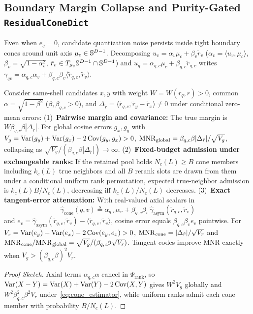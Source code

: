 \subsection{Boundary Margin Collapse and Purity-Gated \texttt{ResidualConeDict}}
\label{subsec:tangent_cone}

Even when $e_q = 0$, candidate quantization noise persists inside tight boundary cones around unit axis $\mu_c \in \mathbb{S}^{D-1}$.
Decomposing $u_v = \alpha_v\mu_c + \beta_v\tilde{r}_v$ ($\alpha_v = \langle u_v, \mu_c\rangle$, $\beta_v = \sqrt{1 - \alpha_v^2}$, $\tilde{r}_v \in T_{\mu_c}\mathbb{S}^{D-1} \cap \mathbb{S}^{D-1}$) and $u_q = \alpha_{q,c}\mu_c + \beta_{q,c}\tilde{r}_{q,c}$ writes $\gamma_{qv} = \alpha_{q,c}\alpha_v + \beta_{q,c}\beta_v\langle \tilde{r}_{q,c}, \tilde{r}_v\rangle$.

\begin{theorem}
\label{thm:tangent_cone}
Consider same-shell candidates $x, y$ with weight $W = W(r_q, r) > 0$, common $\alpha = \sqrt{1 - \beta^2}$ ($\beta, \beta_{q,c} > 0$), and $\Delta_{\tilde{r}} = \langle \tilde{r}_{q,c}, \tilde{r}_y - \tilde{r}_x\rangle \ne 0$ under conditional zero-mean errors:
(1)~\textbf{Pairwise margin and covariance:} The true margin is $W\beta_{q,c}\beta|\Delta_{\tilde{r}}|$. For global cosine errors $g_x, g_y$ with $V_g = \operatorname{Var}(g_y) + \operatorname{Var}(g_x) - 2\operatorname{Cov}(g_y, g_x) > 0$, $\mathrm{MNR}_{\mathrm{global}} = \beta_{q,c}\beta|\Delta_{\tilde{r}}| / \sqrt{V_g}$, collapsing as $\sqrt{V_g}/(\beta_{q,c}\beta|\Delta_{\tilde{r}}|) \to \infty$.
(2)~\textbf{Fixed-budget admission under exchangeable ranks:} If the retained pool holds $N_c(L) \ge B$ cone members including $k_c(L)$ true neighbors and all $B$ rerank slots are drawn from them under a conditional uniform rank permutation, expected true-neighbor admission is $k_c(L) B / N_c(L)$, decreasing iff $k_c(L) / N_c(L)$ decreases.
(3)~\textbf{Exact tangent-error attenuation:} With real-valued axial scalars in
\begin{equation}
  \hat{\gamma}_{\mathrm{cone}}(q, v) \triangleq \alpha_{q,c}\alpha_v + \beta_{q,c}\beta_v\,\hat{\gamma}_{\mathrm{asym}}(\tilde{r}_{q,c}, \tilde{r}_v)
  \label{eq:cone_estimator}
\end{equation}
and $e_v = \hat{\gamma}_{\mathrm{asym}}(\tilde{r}_{q,c}, \tilde{r}_v) - \langle \tilde{r}_{q,c}, \tilde{r}_v\rangle$, cosine error equals $\beta_{q,c}\beta_v e_v$ pointwise. For $V_r = \operatorname{Var}(e_y) + \operatorname{Var}(e_x) - 2\operatorname{Cov}(e_y, e_x) > 0$, $\mathrm{MNR}_{\mathrm{cone}} = |\Delta_{\tilde{r}}| / \sqrt{V_r}$ and $\mathrm{MNR}_{\mathrm{cone}} / \mathrm{MNR}_{\mathrm{global}} = \sqrt{V_g} / (\beta_{q,c}\beta\sqrt{V_r})$. Tangent codes improve MNR exactly when $V_g>(\beta_{q,c}\beta)^2 V_r$.
\end{theorem}
\begin{proof}[Proof Sketch]
Axial terms $\alpha_{q,c}\alpha$ cancel in $\Psi_{\mathrm{rank}}$, so $\operatorname{Var}(X - Y) = \operatorname{Var}(X) + \operatorname{Var}(Y) - 2\operatorname{Cov}(X, Y)$ gives $W^2 V_g$ globally and $W^2\beta_{q,c}^2\beta^2 V_r$ under~\eqref{eq:cone_estimator}, while uniform ranks admit each cone member with probability $B / N_c(L)$.
\end{proof}

